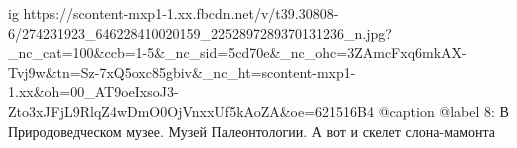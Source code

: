  
 
 
 
 

\ifcmt
  ig https://scontent-mxp1-1.xx.fbcdn.net/v/t39.30808-6/274231923_646228410020159_2252897289370131236_n.jpg?_nc_cat=100&ccb=1-5&_nc_sid=5cd70e&_nc_ohc=3ZAmcFxq6mkAX-Tvj9w&tn=Sz-7xQ5oxc85gbiv&_nc_ht=scontent-mxp1-1.xx&oh=00_AT9oeIxsoJ3-Zto3xJFjL9RlqZ4wDmO0OjVnxxUf5kAoZA&oe=621516B4
  @caption @label 8: В Природоведческом музее. Музей Палеонтологии. А вот и скелет слона-мамонта
\fi
